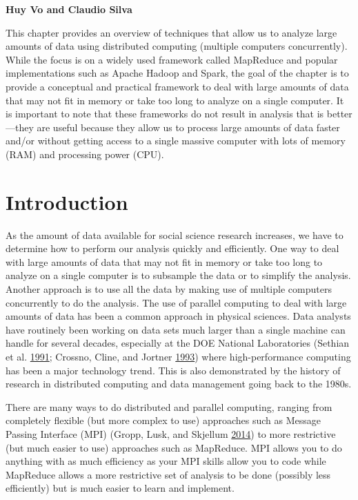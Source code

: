 \documentclass[]{krantz}
\begin{document}
\textbf{Huy Vo and Claudio Silva}

This chapter provides an overview of techniques that allow us to analyze
large amounts of data using distributed computing (multiple computers
concurrently). While the focus is on a widely used framework called
MapReduce and popular implementations such as Apache Hadoop and Spark,
the goal of the chapter is to provide a conceptual and practical
framework to deal with large amounts of data that may not fit in memory
or take too long to analyze on a single computer. It is important to
note that these frameworks do not result in analysis that is
better---they are useful because they allow us to process large amounts
of data faster and/or without getting access to a single massive
computer with lots of memory (RAM) and processing power (CPU).

\section{Introduction}\label{introduction-1}

As the amount of data available for social science research increases,
we have to determine how to perform our analysis quickly and
efficiently. One way to deal with large amounts of data that may not fit
in memory or take too long to analyze on a single computer is to
subsample the data or to simplify the analysis. Another approach is to
use all the data by making use of multiple computers concurrently to do
the analysis. The use of parallel computing to deal with large amounts
of data has been a common approach in physical sciences. Data analysts
have routinely been working on data sets much larger than a single
machine can handle for several decades, especially at the DOE National
Laboratories (Sethian et al. \protect\hyperlink{ref-bigdata_old1}{1991};
Crossno, Cline, and Jortner
\protect\hyperlink{ref-crossno1993heterogeneous}{1993}) where
high-performance computing has been a major technology trend. This is
also demonstrated by the history of research in distributed computing
and data management going back to the 1980s.

There are many ways to do distributed and parallel computing, ranging
from completely flexible (but more complex to use) approaches such as
Message Passing Interface (MPI) (Gropp, Lusk, and Skjellum
\protect\hyperlink{ref-mpi}{2014}) to more restrictive (but much easier
to use) approaches such as MapReduce. MPI allows you to do anything with
as much efficiency as your MPI skills allow you to code while MapReduce
allows a more restrictive set of analysis to be done (possibly less
efficiently) but is much easier to learn and implement.
\end{document}
